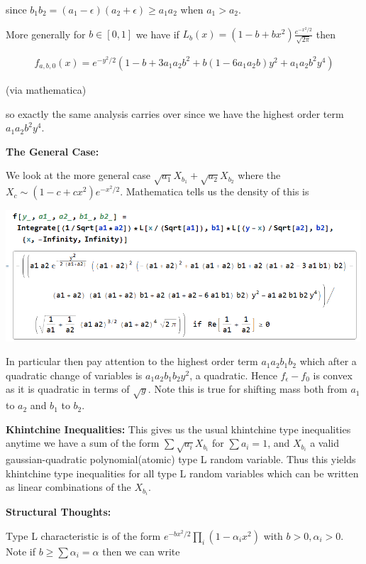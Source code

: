 \documentclass[11pt]{article}
\theoremstyle{remark}
\begin{document}
since $b_1b_2 = (a_1-\epsilon)(a_2 + \epsilon) \geq a_1a_2$ when $a_1 > a_2$. 

More generally for $b \in [0,1]$ we have if $L_b(x) = (1-b+bx^2)\frac{e^{-x^2/2}}{\sqrt{2 \pi}}$ then 

\begin{align*}
	f_{a,b,0}(x) = e^{-y^2/2}(1-b+3a_1a_2b^2 + b(1-6a_1a_2b)y^2 + a_1a_2 b^2y^4)
\end{align*}

(via mathematica)

so exactly the same analysis carries over since we have the highest order term $a_1a_2b^2y^4$. 

\textbf{The General Case:}

We look at the more general case $\sqrt{a_1}X_{b_1} + \sqrt{a_2}X_{b_2}$ where the $X_c \sim (1-c +cx^2)e^{-x^2/2}$. Mathematica tells us the density of this is 

\includegraphics[width=500px]{pics/a_b_parameterization.PNG}

In particular then pay attention to the highest order term $a_1a_2b_1b_2$ which after a quadratic change of variables is $a_1a_2b_1b_2y^2$, a quadratic. Hence $f_{\epsilon} - f_0$ is convex as it is quadratic in terms of $\sqrt{y}$. Note this is true for shifting mass both from $a_1$ to $a_2$ and $b_1$ to $b_2$. 

\textbf{Khintchine Inequalities:} This gives us the usual khintchine type inequalities anytime we have a sum of the form $\sum \sqrt{a_i}X_{b_i}$ for $\sum a_i = 1$, and $X_{b_i}$ a valid gaussian-quadratic polynomial(atomic) type L random variable. Thus this yields khintchine type inequalities for all type L random variables which can be written as linear combinations of the $X_{b_i}$.



\textbf{Structural Thoughts:}


Type L characteristic is of the form $e^{-bx^2/2}\prod_i (1- \alpha_i x^2)$ with $b > 0,\alpha_i > 0$. Note if $b \geq \sum \alpha_i = \alpha$ then we can write 
\end{document}
